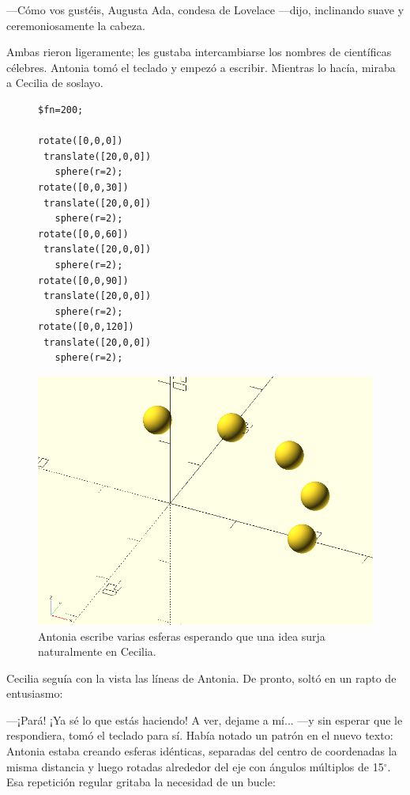   ---Cómo vos gustéis, Augusta Ada, condesa de Lovelace ---dijo,
  inclinando suave y ceremoniosamente la cabeza.

  Ambas rieron ligeramente; les gustaba intercambiarse los nombres de
  científicas célebres.  Antonia tomó el teclado y empezó a
  escribir. Mientras lo hacía, miraba a Cecilia de soslayo.

  
\begin{figure}[ht]
  \begin{minipage}[]{.5\textwidth}
    \begin{lstlisting}
$fn=200;

rotate([0,0,0])
 translate([20,0,0])
   sphere(r=2);
rotate([0,0,30])
 translate([20,0,0])
   sphere(r=2);
rotate([0,0,60])
 translate([20,0,0])
   sphere(r=2);
rotate([0,0,90])
 translate([20,0,0])
   sphere(r=2);
rotate([0,0,120])
 translate([20,0,0])
   sphere(r=2);
    \end{lstlisting}%
  \end{minipage}\hfill
    \begin{minipage}[]{.5\textwidth}
      \centering
      \includegraphics[width=\textwidth]{imagenes/varias-esferas}
    \end{minipage}
    \caption{Antonia escribe varias esferas esperando que una idea
      surja naturalmente en Cecilia.}
    \label{varias-esferas}
  \end{figure}
  
  Cecilia seguía con la vista las líneas de Antonia. De pronto, soltó
  en un rapto de entusiasmo:

  ---¡Pará! ¡Ya sé lo que estás haciendo! A ver, dejame a mí... ---y
  sin esperar que le respondiera, tomó el teclado para sí. Había
  notado un patrón en el nuevo texto: Antonia estaba creando esferas
  idénticas, separadas del centro de coordenadas la misma distancia y
  luego rotadas alrededor del eje  con ángulos múltiplos de
  15$^{\circ}$. Esa repetición regular gritaba la necesidad de un
  bucle:

